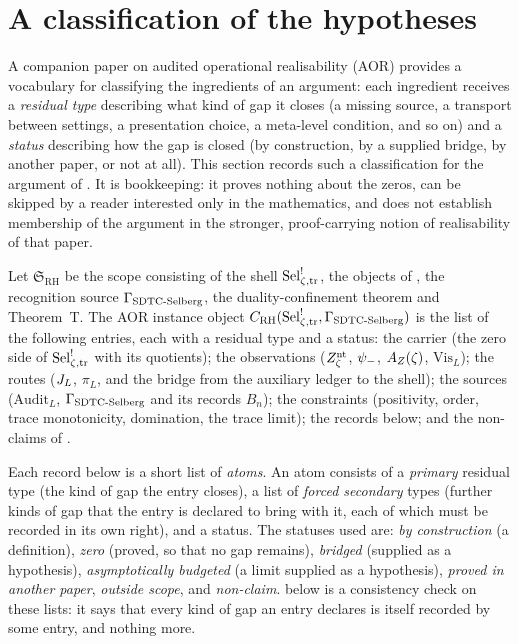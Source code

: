 \section{A classification of the hypotheses}
\label{sec:rh-aor-instance}

A companion paper on audited operational realisability (AOR)
\citep{TsiokosAOR2026} provides a vocabulary for classifying the
ingredients of an argument: each ingredient receives a \emph{residual
type} describing what kind of gap it closes (a missing source, a
transport between settings, a presentation choice, a meta-level
condition, and so on) and a \emph{status} describing how the gap is
closed (by construction, by a supplied bridge, by another paper, or
not at all).  This section records such a classification for the
argument of .  It is bookkeeping: it proves nothing about the zeros, can be skipped
by a reader interested only in the mathematics, and does not establish
membership of the
argument in the stronger, proof-carrying notion of realisability of
that paper.

\begin{definition}
\label{def:rh:aor-sel-instance}
Let \(\mathfrak S_{\mathrm{RH}}\) be the scope consisting of the shell
\(\mathrm{Sel}^{!}_{\zeta,\mathrm{tr}}\), the objects of , the
recognition source \(\Gamma_{\mathrm{SDTC\text{-}Selberg}}\), the duality-confinement theorem
and Theorem~T.  The AOR instance object
\(C_{\mathrm{RH}}(\mathrm{Sel}^{!}_{\zeta,\mathrm{tr}},\Gamma_{\mathrm{SDTC\text{-}Selberg}})\) is the list of the following
entries, each with a residual type and a status:
the carrier (the zero side of \(\mathrm{Sel}^{!}_{\zeta,\mathrm{tr}}\) with its quotients); the
observations (\(Z_{\zeta}^{\mathrm{nt}}\), \(\psi_{-}\), \(A_{Z}(\zeta)\), \(\mathrm{Vis}_L\)); the
routes (\(J_{L}\), \(\pi_L\), and the bridge from the auxiliary ledger to
the shell); the sources (\(\mathrm{Audit}_L\), \(\Gamma_{\mathrm{SDTC\text{-}Selberg}}\) and
its records \(B_n\)); the constraints (positivity, order, trace
monotonicity, domination, the trace limit); the records 
below; and the non-claims of .
\end{definition}

Each record below is a short list of \emph{atoms}.  An atom consists of
a \emph{primary} residual type (the kind of gap the entry closes), a
list of \emph{forced secondary} types (further kinds of gap that the
entry is declared to bring with it, each of which must be recorded in
its own right), and a status.  The statuses used are: \emph{by construction} (a definition),
\emph{zero} (proved, so that no gap remains), \emph{bridged} (supplied
as a hypothesis), \emph{asymptotically budgeted} (a limit supplied as a
hypothesis), \emph{proved in another paper}, \emph{outside scope}, and
\emph{non-claim}.   below is a consistency
check on these lists: it says that every kind of gap an entry declares
is itself recorded by some entry, and nothing more.

